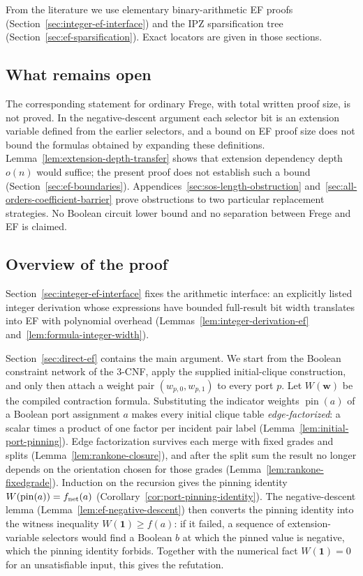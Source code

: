 \documentclass[11pt]{article}
\theoremstyle{definition}
\theoremstyle{remark}
\begin{document}
From the literature we use elementary binary-arithmetic EF
proofs~\cite{kls} (Section~\ref{sec:integer-ef-interface}) and the
IPZ sparsification tree~\cite{ipz} (Section~\ref{sec:ef-sparsification}).
Exact locators are given in those sections.

\subsection{What remains open}

The corresponding statement for ordinary Frege, with total written
proof size, is not proved. In the negative-descent argument each
selector bit is an extension variable defined from the earlier
selectors, and a bound on EF proof size does not bound the formulas
obtained by expanding these definitions.
Lemma~\ref{lem:extension-depth-transfer} shows that extension
dependency depth $o(n)$ would suffice; the present proof does not
establish such a bound (Section~\ref{sec:ef-boundaries}).
Appendices~\ref{sec:sos-length-obstruction}
and~\ref{sec:all-orders-coefficient-barrier} prove obstructions to two
particular replacement strategies. No Boolean circuit lower bound and
no separation between Frege and EF is claimed.

\subsection{Overview of the proof}

Section~\ref{sec:integer-ef-interface} fixes the arithmetic interface:
an explicitly listed integer derivation whose expressions have bounded
full-result bit width translates into EF with polynomial overhead
(Lemmas~\ref{lem:integer-derivation-ef}
and~\ref{lem:formula-integer-width}).

Section~\ref{sec:direct-ef} contains the main argument. We start from
the Boolean constraint network of the 3-CNF, apply the supplied
initial-clique construction, and only then attach a weight pair
$(w_{p,0},w_{p,1})$ to every port $p$. Let $W(\mathbf w)$ be the
compiled contraction formula. Substituting the indicator weights
$\operatorname{pin}(a)$ of a Boolean port assignment $a$ makes every
initial clique table \emph{edge-factorized}: a scalar times a product
of one factor per incident pair label
(Lemma~\ref{lem:initial-port-pinning}). Edge factorization survives
each merge with fixed grades and splits
(Lemma~\ref{lem:rankone-closure}), and after the split sum the result
no longer depends on the orientation chosen for those grades
(Lemma~\ref{lem:rankone-fixedgrade}). Induction on the recursion gives
the pinning identity $W(\operatorname{pin}(a))=f_{\rm net}(a)$
(Corollary~\ref{cor:port-pinning-identity}). The negative-descent
lemma (Lemma~\ref{lem:ef-negative-descent}) then converts the pinning
identity into the witness inequality $W(\mathbf1)\ge f(a)$: if it
failed, a sequence of extension-variable selectors would find a
Boolean $b$ at which the pinned value is negative, which the pinning
identity forbids. Together with the numerical fact $W(\mathbf1)=0$
for an unsatisfiable input, this gives the refutation.
\end{document}
